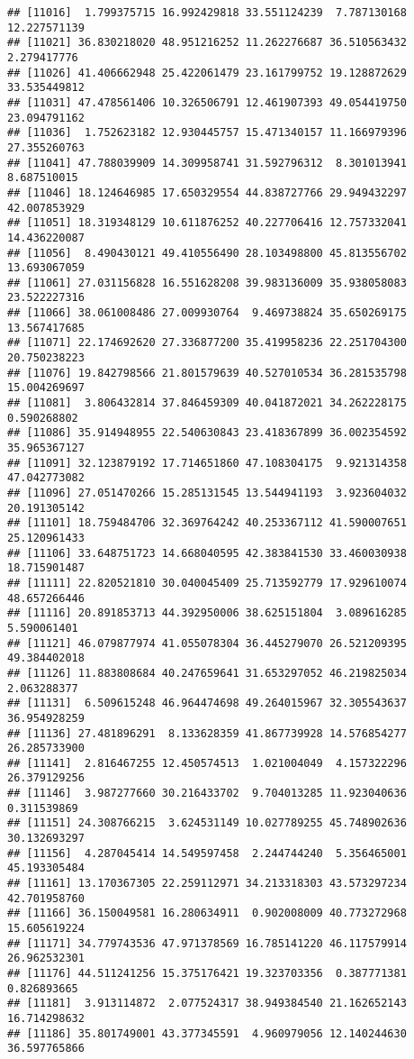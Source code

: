 \documentclass[
]{article}
\begin{document}
\begin{verbatim}
## [11016]  1.799375715 16.992429818 33.551124239  7.787130168 12.227571139
## [11021] 36.830218020 48.951216252 11.262276687 36.510563432  2.279417776
## [11026] 41.406662948 25.422061479 23.161799752 19.128872629 33.535449812
## [11031] 47.478561406 10.326506791 12.461907393 49.054419750 23.094791162
## [11036]  1.752623182 12.930445757 15.471340157 11.166979396 27.355260763
## [11041] 47.788039909 14.309958741 31.592796312  8.301013941  8.687510015
## [11046] 18.124646985 17.650329554 44.838727766 29.949432297 42.007853929
## [11051] 18.319348129 10.611876252 40.227706416 12.757332041 14.436220087
## [11056]  8.490430121 49.410556490 28.103498800 45.813556702 13.693067059
## [11061] 27.031156828 16.551628208 39.983136009 35.938058083 23.522227316
## [11066] 38.061008486 27.009930764  9.469738824 35.650269175 13.567417685
## [11071] 22.174692620 27.336877200 35.419958236 22.251704300 20.750238223
## [11076] 19.842798566 21.801579639 40.527010534 36.281535798 15.004269697
## [11081]  3.806432814 37.846459309 40.041872021 34.262228175  0.590268802
## [11086] 35.914948955 22.540630843 23.418367899 36.002354592 35.965367127
## [11091] 32.123879192 17.714651860 47.108304175  9.921314358 47.042773082
## [11096] 27.051470266 15.285131545 13.544941193  3.923604032 20.191305142
## [11101] 18.759484706 32.369764242 40.253367112 41.590007651 25.120961433
## [11106] 33.648751723 14.668040595 42.383841530 33.460030938 18.715901487
## [11111] 22.820521810 30.040045409 25.713592779 17.929610074 48.657266446
## [11116] 20.891853713 44.392950006 38.625151804  3.089616285  5.590061401
## [11121] 46.079877974 41.055078304 36.445279070 26.521209395 49.384402018
## [11126] 11.883808684 40.247659641 31.653297052 46.219825034  2.063288377
## [11131]  6.509615248 46.964474698 49.264015967 32.305543637 36.954928259
## [11136] 27.481896291  8.133628359 41.867739928 14.576854277 26.285733900
## [11141]  2.816467255 12.450574513  1.021004049  4.157322296 26.379129256
## [11146]  3.987277660 30.216433702  9.704013285 11.923040636  0.311539869
## [11151] 24.308766215  3.624531149 10.027789255 45.748902636 30.132693297
## [11156]  4.287045414 14.549597458  2.244744240  5.356465001 45.193305484
## [11161] 13.170367305 22.259112971 34.213318303 43.573297234 42.701958760
## [11166] 36.150049581 16.280634911  0.902008009 40.773272968 15.605619224
## [11171] 34.779743536 47.971378569 16.785141220 46.117579914 26.962532301
## [11176] 44.511241256 15.375176421 19.323703356  0.387771381  0.826893665
## [11181]  3.913114872  2.077524317 38.949384540 21.162652143 16.714298632
## [11186] 35.801749001 43.377345591  4.960979056 12.140244630 36.597765866

\end{verbatim}
\end{document}
